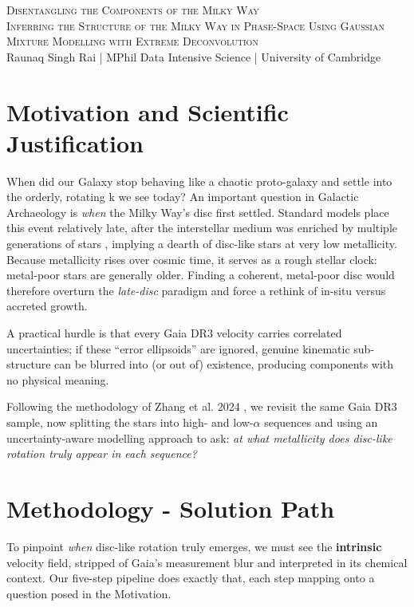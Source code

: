 \documentclass[a4paper,10pt]{article}
\begin{document}
\begin{center}
    {\Large \textsc{Disentangling the Components of the Milky Way}}\\[0.2cm]
    {\textsc{Inferring the Structure of the Milky Way in Phase-Space Using Gaussian Mixture Modelling with Extreme Deconvolution}}\\[0.2cm]
    Raunaq Singh Rai \quad | \quad MPhil Data Intensive Science \quad | \quad University of Cambridge
\end{center}

\begin{multicols}{2}

\section*{Motivation and Scientific Justification}

When did our Galaxy stop behaving like a chaotic proto-galaxy and settle into the orderly,
rotating k we see today?  An important question in Galactic Archaeology is
\emph{when} the Milky Way's disc first settled.  Standard models place this event
relatively late, after the interstellar medium was enriched by multiple generations of
stars \cite{Sestito2020,Gurvich2023}, implying a dearth of disc-like stars at very low
metallicity.  Because metallicity rises over cosmic time, it serves as a rough stellar
clock: metal-poor stars are generally older.  Finding a coherent, metal-poor disc would
therefore overturn the \emph{late-disc} paradigm and force a rethink of in-situ versus
accreted growth.

A practical hurdle is that every Gaia DR3 velocity carries correlated uncertainties; if
these “error ellipsoids” are ignored, genuine kinematic sub-structure can be blurred
into (or out of) existence, producing components with no physical meaning.  

Following the methodology of Zhang et al. 2024 \cite{zhang2024existencemetalpoordiscmilky}, 
we revisit the same Gaia DR3 sample, now splitting the stars into high- and
low-$\alpha$ sequences \cite{Vis2024} and using an uncertainty-aware modelling approach
to ask: \emph{at what metallicity does disc-like rotation truly appear in each
sequence?}


\section*{Methodology - Solution Path}

To pinpoint \emph{when} disc-like rotation truly emerges, we must see the
\textbf{intrinsic} velocity field, stripped of Gaia's measurement blur and
interpreted in its chemical context.  Our five-step pipeline does exactly that,
each step mapping onto a question posed in the Motivation.


\end{multicols}
\end{document}
